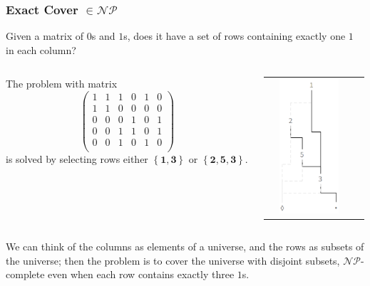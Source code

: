 \documentclass[10pt]{beamer}
\begin{document}
\begin{frame}[fragile]
\frametitle{Exact Cover $\in \mathcal{NP}$}
Given a matrix of $0$s and $1$s, does it have a set of rows containing exactly one $1$ in each column?
\begin{columns}
     \begin{column}{.5\linewidth}
      The problem with matrix
      \begin{displaymath}
       \left(\begin{array}{cccccc}
         1 & 1 & 1 & 0 & 1 & 0 \\
         1 & 1 & 0 & 0 & 0 & 0 \\
         0 & 0 & 0 & 1 & 0 & 1 \\
         0 & 0 & 1 & 1 & 0 & 1 \\
         0 & 0 & 1 & 0 & 1 & 0 \\
       \end{array}\right)
      \end{displaymath}
      is solved by selecting rows either $
          \left\lbrace \boldsymbol{1}, \boldsymbol{3}\right\rbrace$ or $
          \left\lbrace \boldsymbol{2},\boldsymbol{5},\boldsymbol{3}\right\rbrace$.
     \end{column}
     \begin{column}{.5\linewidth}
       \begin{tabular}{cc}
          \includegraphics[width=3cm,height=5cm]{ZDD.png}
       \end{tabular}
     \end{column}
   \end{columns}
We can think of the columns as elements of a universe, and the rows as subsets of the universe; 
then the problem is to cover the universe with disjoint subsets, $\mathcal{NP}$-complete even 
when each row contains exactly three $1$s.
\end{frame}
\end{document}
